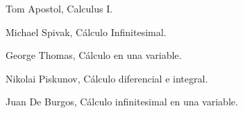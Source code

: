 \let\cleardoublepage\clearpage
\begin{thebibliography}{10}



    \bibitem{} Tom Apostol, Calculus I. 

    \bibitem{} Michael Spivak, Cálculo Infinitesimal. 

    \bibitem{} George Thomas, Cálculo en una variable.	

    \bibitem{} Nikolai Piskunov, Cálculo diferencial e integral.

    \bibitem{} Juan De Burgos, Cálculo infinitesimal en una variable.

\end{thebibliography}
